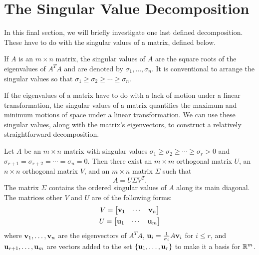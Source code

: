 \documentclass[../m073main.tex]{subfiles}
\begin{document}
\section{The Singular Value Decomposition}
In this final section, we will briefly investigate one last defined decomposition.
These have to do with the singular values of a matrix, defined below.

\begin{definition}
	If $A$ is an $m \times n$ matrix, the singular values of $A$ are the square roots of the eigenvalues of $A^T A$ and are denoted by $\sigma_1, \ldots, \sigma_n$. It is conventional to arrange the singular values so that $\sigma_1 \geq \sigma_2 \geq \cdots \geq \sigma_n$.
\end{definition}

If the eigenvalues of a matrix have to do with a lack of motion under a linear transformation, the singular values of a matrix quantifies the maximum and minimum motions of space under a linear transformation.
We can use these singular values, along with the matrix's eigenvectors, to construct a relatively straightforward decomposition.

\begin{theorem}
	Let $A$ be an $m \times n$ matrix with singular values $\sigma_1 \geq \sigma_2 \geq \cdots \geq \sigma_r > 0$ and $\sigma_{r+1} = \sigma_{r+2} = \cdots = \sigma_n = 0$.
	Then there exist an $m \times m$ orthogonal matrix $U$, an $n \times n$ orthogonal matrix $V$, and an $m \times n$ matrix $\Sigma$ such that
	\[ A = U \Sigma V^T. \]
	The matrix $\Sigma$ contains the ordered singular values of $A$ along its main diagonal.
	The matrices other $V$ and $U$ are of the following forms:
	\begin{gather*}
		V = \begin{bmatrix} \mathbf{v}_1 & \cdots & \mathbf{v}_n \end{bmatrix} \\
		U = \begin{bmatrix} \mathbf{u}_1 & \cdots & \mathbf{u}_m \end{bmatrix}
	\end{gather*}
	where $\mathbf{v}_1, \ldots, \mathbf{v}_n$ are the eigenvectors of $A^T A$, $\mathbf{u}_i = \frac{1}{\sigma_i} A \mathbf{v}_i$ for $i \leq r$, and $\mathbf{u}_{r+1}, \ldots, \mathbf{u}_m$ are vectors added to the set $\{ \mathbf{u}_1, \ldots, \mathbf{u}_r \}$ to make it a basis for $\mathbb{R}^m$.
\end{theorem}
\end{document}
